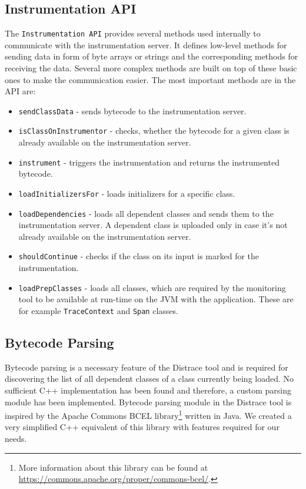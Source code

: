 \subsection{Instrumentation API}
The \texttt{Instrumentation API} provides several methods used internally to communicate with the instrumentation server. It defines low-level methods for sending data in form of byte arrays or strings and the corresponding methods for receiving the data. Several more complex methods are built on top of these basic ones to make the communication easier. The most important methods are in the API are:
\begin{itemize}
	\item \texttt{sendClassData} - sends bytecode to the instrumentation server.
	\item \texttt{isClassOnInstrumentor} - checks, whether the bytecode for a given class is already available on the instrumentation server.
	\item \texttt{instrument} - triggers the instrumentation and returns the instrumented bytecode.
	\item \texttt{loadInitializersFor} - loads initializers for a specific class.
	\item \texttt{loadDependencies} - loads all dependent classes and sends them to the instrumentation server.  A dependent class is uploaded only in case it's not already available on the instrumentation server.
	\item \texttt{shouldContinue} - checks if the class on its input is marked for the instrumentation.
	\item \texttt{loadPrepClasses} - loads all classes, which are required by the monitoring tool to be available at run-time on the JVM with the application. These are for example \texttt{TraceContext} and \texttt{Span} classes.
\end{itemize}

\subsection{Bytecode Parsing}
\label{imp:parsing}
Bytecode parsing is a necessary feature of the Distrace tool and is required for discovering the list of all dependent classes of a class currently being loaded. No sufficient C++ implementation has been found and therefore, a custom parsing module has been implemented. Bytecode parsing module in the Distrace tool is inspired by the Apache Commons BCEL library\footnote{More information about this library can be found at \url{https://commons.apache.org/proper/commons-bcel/}.} written in Java. We created a very simplified C++ equivalent of this library with features required for our needs.

